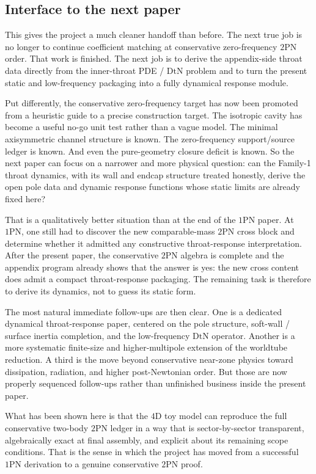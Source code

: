 \documentclass[11pt]{article}
\newcommand{\OnePN}{\mathrm{1PN}}
\newcommand{\TwoPN}{\mathrm{2PN}}
\newcommand{\DtN}{\mathrm{DtN}}
\begin{document}
\subsection{Interface to the next paper}
\label{sec:conclusion-next}

This gives the project a much cleaner handoff than before.
The next true job is no longer to continue coefficient matching at conservative
zero-frequency \(\TwoPN\) order.
That work is finished.
The next job is to derive the appendix-side throat data directly from the inner-throat
PDE / \(\DtN\) problem and to turn the present static and low-frequency packaging into a
fully dynamical response module.

Put differently, the conservative zero-frequency target has now been promoted from a
heuristic guide to a precise construction target.
The isotropic cavity has become a useful no-go unit test rather than a vague model.
The minimal axisymmetric channel structure is known.
The zero-frequency support/source ledger is known.
And even the pure-geometry closure deficit is known.
So the next paper can focus on a narrower and more physical question:
can the Family-1 throat dynamics, with its wall and endcap structure treated honestly,
derive the open pole data and dynamic response functions whose static limits are already
fixed here?

That is a qualitatively better situation than at the end of the \(\OnePN\) paper.
At \(\OnePN\), one still had to discover the new comparable-mass \(\TwoPN\) cross block
and determine whether it admitted any constructive throat-response interpretation.
After the present paper, the conservative \(\TwoPN\) algebra is complete and the appendix
program already shows that the answer is yes: the new cross content does admit a compact
throat-response packaging.
The remaining task is therefore to derive its dynamics, not to guess its static form.

The most natural immediate follow-ups are then clear.
One is a dedicated dynamical throat-response paper, centered on the pole structure,
soft-wall / surface inertia completion, and the low-frequency \(\DtN\) operator.
Another is a more systematic finite-size and higher-multipole extension of the worldtube
reduction.
A third is the move beyond conservative near-zone physics toward dissipation, radiation,
and higher post-Newtonian order.
But those are now properly sequenced follow-ups rather than unfinished business inside the
present paper.

What has been shown here is that the \(4\)D toy model can reproduce the full conservative
two-body \(\TwoPN\) ledger in a way that is sector-by-sector transparent, algebraically
exact at final assembly, and explicit about its remaining scope conditions.
That is the sense in which the project has moved from a successful \(\OnePN\) derivation
to a genuine conservative \(\TwoPN\) proof.
\end{document}
